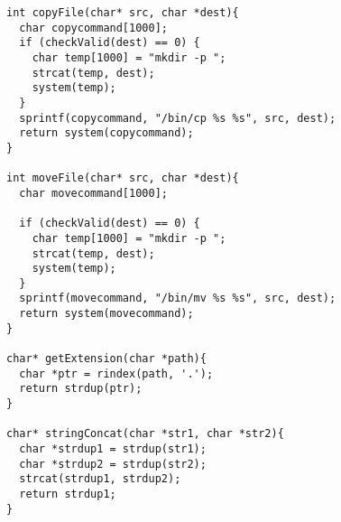 \documentclass[11pt]{article}
\begin{document}
\begin{listing}[H]
  \begin{verbatim}
int copyFile(char* src, char *dest){
  char copycommand[1000];
  if (checkValid(dest) == 0) {
    char temp[1000] = "mkdir -p ";
    strcat(temp, dest);
    system(temp);
  }
  sprintf(copycommand, "/bin/cp %s %s", src, dest);
  return system(copycommand);
}

int moveFile(char* src, char *dest){
  char movecommand[1000];

  if (checkValid(dest) == 0) {
    char temp[1000] = "mkdir -p ";
    strcat(temp, dest);
    system(temp);
  }
  sprintf(movecommand, "/bin/mv %s %s", src, dest);
  return system(movecommand);
}

char* getExtension(char *path){
  char *ptr = rindex(path, '.');
  return strdup(ptr);
}

char* stringConcat(char *str1, char *str2){
  char *strdup1 = strdup(str1);
  char *strdup2 = strdup(str2);
  strcat(strdup1, strdup2);
  return strdup1;
}
  \end{verbatim}
\end{listing}
\end{document}

